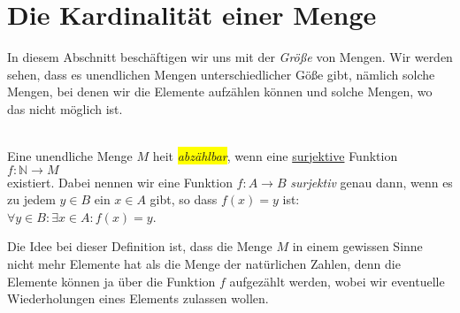 \section{Die Kardinalit\"at einer Menge}
In diesem Abschnitt besch\"aftigen wir uns mit der \emph{Gr\"o{\ss}e} von Mengen.  Wir werden sehen,
dass es unendlichen Mengen unterschiedlicher G\"o{\ss}e gibt, n\"amlich solche Mengen, bei denen wir
die Elemente aufz\"ahlen k\"onnen und solche Mengen, wo das nicht m\"oglich ist.

\begin{Definition} \hspace*{\fill} \\
Eine unendliche Menge $M$ hei\3t \colorbox{yellow}{\emph{abz\"{a}hlbar}}, wenn eine 
\underline{sur}j\underline{ektive} Funktion
\\[0.2cm]
\hspace*{1.3cm}
$f: \mathbb{N} \rightarrow M$
\\[0.2cm]
existiert.  Dabei nennen wir eine Funktion $f:A \rightarrow B$  \emph{surjektiv} genau
dann, wenn es zu jedem $y \in B$ ein $x \in A$ gibt, so dass $f(x) = y$ ist:
\\[0.2cm]
\hspace*{1.3cm}
$\forall y \in B: \exists x \in A: f(x) = y$.  \eox
\end{Definition}

Die Idee bei dieser Definition ist, dass die Menge  $M$ in einem gewissen Sinne nicht mehr Elemente hat
als die Menge der nat\"{u}rlichen Zahlen, denn die Elemente k\"{o}nnen ja \"{u}ber die Funktion $f$
aufgez\"{a}hlt werden, wobei wir eventuelle Wiederholungen eines Elements zulassen wollen.

